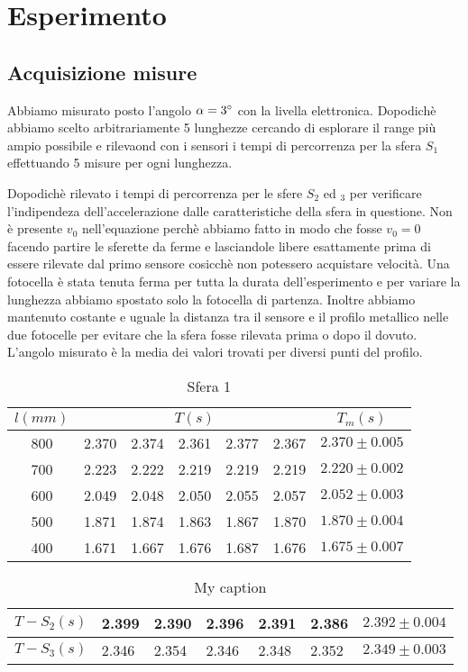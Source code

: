\documentclass[a4paper,10pt]{article}
\begin{document}
\section{Esperimento}
\subsection{Acquisizione misure}
Abbiamo misurato posto l'angolo $\alpha=3\degree$ con la livella elettronica. Dopodichè abbiamo scelto arbitrariamente 5 lunghezze cercando di esplorare il range più ampio possibile e rilevaond con i sensori i tempi di percorrenza per la sfera $S_1$ effettuando 5 misure per ogni lunghezza. 

Dopodichè  rilevato i tempi di percorrenza per le sfere $S_2$ ed $_3$ per verificare l'indipendeza dell'accelerazione dalle caratteristiche della sfera in questione.
Non è presente $v_0$ nell'equazione perchè abbiamo fatto in modo che fosse $v_0=0$ facendo partire le sferette da ferme e lasciandole libere esattamente prima di essere rilevate dal primo sensore cosicchè non potessero acquistare velocità.
Una fotocella è stata tenuta ferma per tutta la durata dell'esperimento e per variare la lunghezza abbiamo spostato solo la fotocella di partenza. Inoltre abbiamo mantenuto costante e uguale la distanza tra
il sensore e il profilo metallico nelle due fotocelle per evitare che la sfera fosse rilevata prima o dopo il dovuto.
 L'angolo misurato è la media dei valori trovati per diversi punti del profilo.
\begin{table}[]
\centering
\caption{Sfera 1}
\label{my-label}
\begin{tabular}{c|ccccc|c}
$l(mm)$ & \multicolumn{5}{c}{$T(s)$}            & $T_m(s)$        \\ \hline
800     & 2.370 & 2.374 & 2.361 & 2.377 & 2.367 & $2.370\pm0.005$ \\
700     & 2.223 & 2.222 & 2.219 & 2.219 & 2.219 & $2.220\pm0.002$ \\
600     & 2.049 & 2.048 & 2.050 & 2.055 & 2.057 & $2.052\pm0.003$ \\
500     & 1.871 & 1.874 & 1.863 & 1.867 & 1.870 & $1.870\pm0.004$ \\
400     & 1.671 & 1.667 & 1.676 & 1.687 & 1.676 & $1.675\pm0.007$
\end{tabular}
\end{table}


\begin{table}[]
\centering
\caption{My caption}
\label{my-label}
\begin{tabular}{l|llllll}
$T-S_2(s)$ & 2.399 & 2.390 & 2.396 & 2.391 & 2.386 & $2.392\pm0.004$ \\ \hline
$T-S_3(s)$ & 2.346 & 2.354 & 2.346 & 2.348 & 2.352 & $2.349\pm0.003$
\end{tabular}
\end{table}
\end{document}

